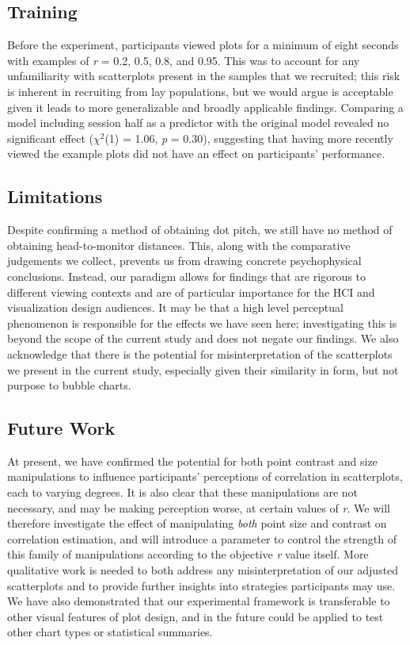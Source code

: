\documentclass{vgtc}                          %
\begin{document}
\hypertarget{training}{%
\subsection{Training}\label{training}}

Before the experiment, participants viewed plots for a minimum of
eight seconds with examples of \emph{r} = 0.2, 0.5, 0.8, and 0.95. This was to account
for any unfamiliarity with scatterplots present in the samples
that we recruited; this risk is inherent in recruiting from lay populations, but we
would argue is acceptable given it leads to more generalizable and broadly
applicable findings. Comparing a model including session half as a predictor with the
original model revealed no significant effect (\(\chi^2\)(1)
= 1.06, \emph{p} = 0.30),
suggesting that having more recently viewed the example plots did not have an effect
on participants' performance.

\hypertarget{limitations}{%
\subsection{Limitations}\label{limitations}}

Despite confirming a method of obtaining dot pitch, we still have no method of obtaining
head-to-monitor distances. This, along with the comparative judgements we collect, prevents us
from drawing concrete psychophysical conclusions. Instead, our paradigm allows
for findings that are rigorous to different viewing contexts and
are of particular importance for the HCI and visualization design audiences. It
may be that a high level perceptual phenomenon is responsible for the effects
we have seen here; investigating this is beyond the scope of the current study and
does not negate our findings. We also acknowledge that there is the potential for misinterpretation
of the scatterplots we present in the current study, especially given their similarity in
form, but not purpose to bubble charts.

\hypertarget{future-work}{%
\subsection{Future Work}\label{future-work}}

At present, we have confirmed the potential for both point contrast and size
manipulations to influence participants' perceptions of correlation in scatterplots,
each to varying degrees. It is also clear that these manipulations are not necessary,
and may be making perception worse, at certain values of \emph{r}. We will therefore
investigate the effect of manipulating \emph{both} point size and contrast on correlation
estimation, and will introduce a parameter to control the strength of this
family of manipulations according to the objective \emph{r} value itself.
More qualitative work is needed to both address any misinterpretation
of our adjusted scatterplots and to provide further insights into strategies
participants may use. We have also demonstrated that our
experimental framework \cite{strain_2023} is transferable to other visual features
of plot design, and in the future could be applied to test other chart types or
statistical summaries.
\end{document}

